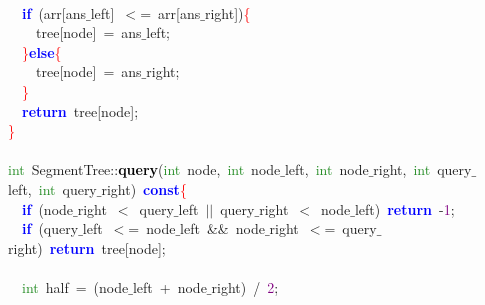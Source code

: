 {{\mbox{} \\
\mbox{}\ \ \textbf{\textcolor{Blue}{if}}\ \textcolor{BrickRed}{(}arr\textcolor{BrickRed}{[}ans$\_$left\textcolor{BrickRed}{]}\ \textcolor{BrickRed}{$<$=}\ arr\textcolor{BrickRed}{[}ans$\_$right\textcolor{BrickRed}{])}\textcolor{Red}{\{} \\
\mbox{}\ \ \ \ tree\textcolor{BrickRed}{[}node\textcolor{BrickRed}{]}\ \textcolor{BrickRed}{=}\ ans$\_$left\textcolor{BrickRed}{;} \\
\mbox{}\ \ \textcolor{Red}{\}}\textbf{\textcolor{Blue}{else}}\textcolor{Red}{\{} \\
\mbox{}\ \ \ \ tree\textcolor{BrickRed}{[}node\textcolor{BrickRed}{]}\ \textcolor{BrickRed}{=}\ ans$\_$right\textcolor{BrickRed}{;} \\
\mbox{}\ \ \textcolor{Red}{\}} \\
\mbox{}\ \ \textbf{\textcolor{Blue}{return}}\ tree\textcolor{BrickRed}{[}node\textcolor{BrickRed}{];} \\
\mbox{}\textcolor{Red}{\}} \\
\mbox{} \\
\mbox{}\textcolor{ForestGreen}{int}\ SegmentTree\textcolor{BrickRed}{::}\textbf{\textcolor{Black}{query}}\textcolor{BrickRed}{(}\textcolor{ForestGreen}{int}\ node\textcolor{BrickRed}{,}\ \textcolor{ForestGreen}{int}\ node$\_$left\textcolor{BrickRed}{,}\ \textcolor{ForestGreen}{int}\ node$\_$right\textcolor{BrickRed}{,}\ \textcolor{ForestGreen}{int}\ query$\_$left\textcolor{BrickRed}{,}\ \textcolor{ForestGreen}{int}\ query$\_$right\textcolor{BrickRed}{)}\ \textbf{\textcolor{Blue}{const}}\textcolor{Red}{\{} \\
\mbox{}\ \ \textbf{\textcolor{Blue}{if}}\ \textcolor{BrickRed}{(}node$\_$right\ \textcolor{BrickRed}{$<$}\ query$\_$left\ \textcolor{BrickRed}{$|$$|$}\ query$\_$right\ \textcolor{BrickRed}{$<$}\ node$\_$left\textcolor{BrickRed}{)}\ \textbf{\textcolor{Blue}{return}}\ \textcolor{BrickRed}{-}\textcolor{Purple}{1}\textcolor{BrickRed}{;} \\
\mbox{}\ \ \textbf{\textcolor{Blue}{if}}\ \textcolor{BrickRed}{(}query$\_$left\ \textcolor{BrickRed}{$<$=}\ node$\_$left\ \textcolor{BrickRed}{\&\&}\ node$\_$right\ \textcolor{BrickRed}{$<$=}\ query$\_$right\textcolor{BrickRed}{)}\ \textbf{\textcolor{Blue}{return}}\ tree\textcolor{BrickRed}{[}node\textcolor{BrickRed}{];} \\
\mbox{} \\
\mbox{}\ \ \textcolor{ForestGreen}{int}\ half\ \textcolor{BrickRed}{=}\ \textcolor{BrickRed}{(}node$\_$left\ \textcolor{BrickRed}{+}\ node$\_$right\textcolor{BrickRed}{)}\ \textcolor{BrickRed}{/}\ \textcolor{Purple}{2}\textcolor{BrickRed}{;} \\
}}
